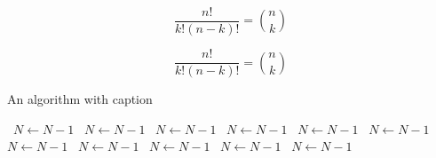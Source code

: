 \documentclass[a4paper]{article}
\begin{document}
\[ \frac{n!}{k!(n-k)!} = \binom{n}{k} \]

\[ \frac{n!}{k!(n-k)!} = \binom{n}{k} \]

\begin{algorithm}
\caption{An algorithm with caption}
\begin{algorithmic}
\    \State $N \gets N - 1$
\    \State $N \gets N - 1$
\    \State $N \gets N - 1$
\    \State $N \gets N - 1$
\    \State $N \gets N - 1$
\    \State $N \gets N - 1$
\    \State $N \gets N - 1$
\    \State $N \gets N - 1$
\    \State $N \gets N - 1$
\    \State $N \gets N - 1$
\    \State $N \gets N - 1$
\EndWhile
\end{algorithmic}
\end{algorithm}
\end{document}
